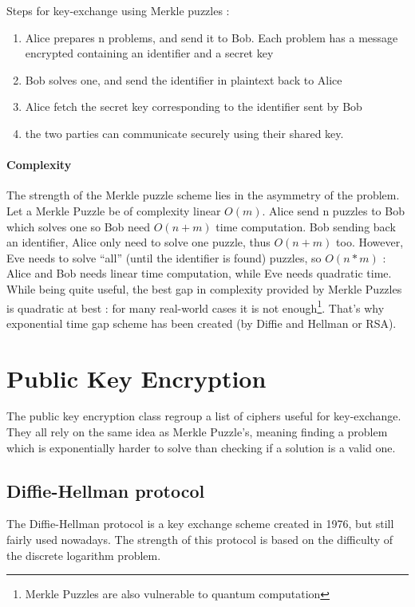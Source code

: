 Steps for key-exchange using Merkle puzzles :
\begin{enumerate}
	\item Alice prepares n problems, and send it to Bob. Each problem has a message encrypted containing an identifier and a secret key
	\item Bob solves one, and send the identifier in plaintext back to Alice
	\item Alice fetch the secret key corresponding to the identifier sent by Bob
	\item the two parties can communicate securely using their shared key.
\end{enumerate}

\paragraph{Complexity}

The strength of the Merkle puzzle scheme lies in the asymmetry of the problem. Let a Merkle Puzzle be of complexity linear $O(m)$.  Alice send n puzzles to Bob which solves one so Bob need $O(n+m)$ time computation. Bob sending back an identifier, Alice only need to solve one puzzle, thus $O(n+m)$ too. However, Eve needs to solve ``all'' (until the identifier is found) puzzles, so $O(n*m)$ : Alice and Bob needs linear time computation, while Eve needs quadratic time.\\

While being quite useful, the best gap in complexity provided by Merkle Puzzles is quadratic at best : for many real-world cases it is not enough\footnote{Merkle Puzzles are also vulnerable to quantum computation}. That's why exponential time gap scheme has been created (by Diffie and Hellman or RSA). 

\section{Public Key Encryption}

The public key encryption class regroup a list of ciphers useful for key-exchange. They all rely on the same idea as Merkle Puzzle's, meaning finding a problem which is exponentially harder to solve than checking if a solution is a valid one.


\subsection{Diffie-Hellman protocol}
The Diffie-Hellman protocol is a key exchange scheme created in 1976, but still fairly used nowadays.  The strength of this protocol is based on the difficulty of the discrete logarithm problem. 

